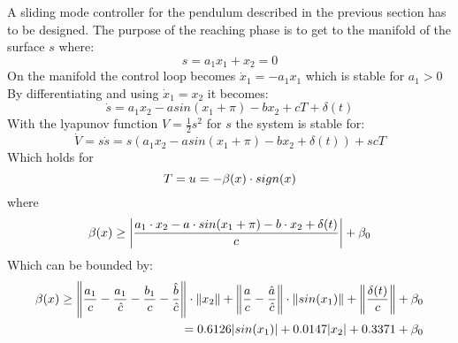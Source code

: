 A sliding mode controller for the pendulum described in the previous section has to be designed. 
The purpose of the reaching phase is to get to the manifold of the surface $s $ where:
\begin{equation}
s = a_1 x_1 + x_2 = 0
\end{equation}
On the manifold the control loop becomes $ \dot{x}_1 = - a_1 x_1   $ which is stable for $ a_1 > 0$
By differentiating and using $ \dot{x}_1 = x_2 $ it becomes:
\begin{equation}
\dot{s} = a_1 x_2 - a sin(x_1 + \pi) - b x_2 + c T + \delta (t)
\end{equation}
With the lyapunov function $V = \frac{1}{2} s^2 $ for $ s $ the system is stable for:
\begin{equation}
 \dot{V} = s \dot{s} =  s (a_1 x_2 - a sin(x_1 + \pi) - b x_2  + \delta (t) ) + s c T
\end{equation}
Which holds for
\begin{equation}
T = u = -\beta (x) \cdot sign(x)
\end{equation}
where
\begin{equation}
\beta (x) \geq \left| \frac{a_1 \cdot x_2 - a \cdot sin(x_1 + \pi) - b \cdot x_2  + \delta (t)}{c} \right| + \beta_0
\end{equation}
Which can be bounded by:
\begin{equation}
	\begin{split}
\beta (x) \geq \left\Vert \frac{a_1}{c} - \frac{a_1}{\hat{c}} -  \frac{b_1}{c} - \frac{\hat{b}}{\hat{c}}  \right\Vert \cdot \left\Vert x_2 \right\Vert + \left\Vert \frac{a}{c} - \frac{\hat{a}}{\hat{c}}  \right\Vert \cdot \left\Vert sin(x_1) \right\Vert + \left\Vert \frac{\delta (t)}{c} \right\Vert + \beta_0 \\
= 0.6126 |sin(x_1)| + 0.0147 |x_2| + 0.3371 + \beta_0
\end{split}
\end{equation}